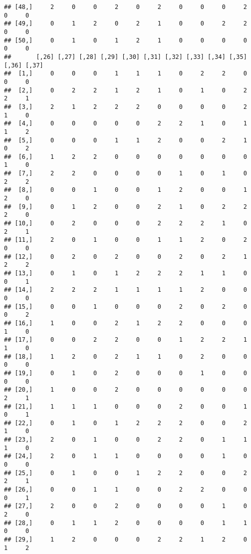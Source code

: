 \documentclass[
]{article}
\begin{document}
\begin{verbatim}
## [48,]     2     0     0     2     0     2     0     0     0     2     0     0
## [49,]     0     1     2     0     2     1     0     0     2     2     0     0
## [50,]     0     1     0     1     2     1     0     0     0     0     0     0
##       [,26] [,27] [,28] [,29] [,30] [,31] [,32] [,33] [,34] [,35] [,36] [,37]
##  [1,]     0     0     0     1     1     1     0     2     2     0     0     0
##  [2,]     0     2     2     1     2     1     0     1     0     2     2     1
##  [3,]     2     1     2     2     2     0     0     0     0     2     1     0
##  [4,]     0     0     0     0     0     2     2     1     0     1     1     2
##  [5,]     0     0     0     1     1     2     0     0     2     1     0     2
##  [6,]     1     2     2     0     0     0     0     0     0     0     1     0
##  [7,]     2     2     0     0     0     0     1     0     1     0     2     2
##  [8,]     0     0     1     0     0     1     2     0     0     1     2     0
##  [9,]     0     1     2     0     0     2     1     0     2     2     2     0
## [10,]     0     2     0     0     0     2     2     2     1     0     2     1
## [11,]     2     0     1     0     0     1     1     2     0     2     0     0
## [12,]     0     2     0     2     0     0     2     0     2     1     2     2
## [13,]     0     1     0     1     2     2     2     1     1     0     0     1
## [14,]     2     2     2     1     1     1     1     2     0     0     0     0
## [15,]     0     0     1     0     0     0     2     0     2     0     0     2
## [16,]     1     0     0     2     1     2     2     0     0     0     1     0
## [17,]     0     0     2     2     0     0     1     2     2     1     1     0
## [18,]     1     2     0     2     1     1     0     2     0     0     0     0
## [19,]     0     1     0     2     0     0     0     1     0     0     0     0
## [20,]     1     0     0     2     0     0     0     0     0     0     2     1
## [21,]     1     1     1     0     0     0     2     0     0     1     0     1
## [22,]     0     1     0     1     2     2     2     0     0     2     1     0
## [23,]     2     0     1     0     0     2     2     0     1     1     1     0
## [24,]     2     0     1     1     0     0     0     0     1     0     0     0
## [25,]     0     1     0     0     1     2     2     0     0     2     2     1
## [26,]     0     0     1     1     0     0     2     2     0     0     0     1
## [27,]     2     0     0     2     0     0     0     0     1     0     2     0
## [28,]     0     1     1     2     0     0     0     0     1     1     0     0
## [29,]     1     2     0     0     0     2     2     1     2     0     1     2

\end{verbatim}
\end{document}
